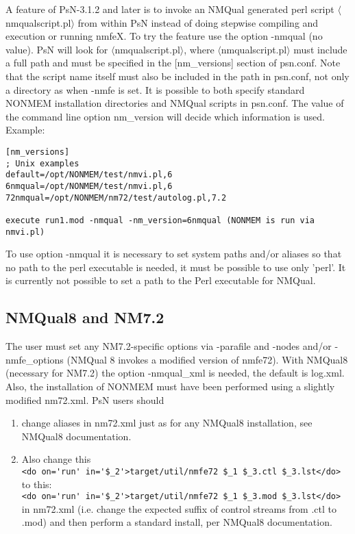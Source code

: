 \documentclass[a4paper,12pt]{article}
\begin{document}
A feature of PsN-3.1.2 and later is to invoke an NMQual generated perl script $\langle$nmqualscript.pl$\rangle$ from within PsN instead of doing stepwise compiling and execution or running nmfeX. To try the feature use the option -nmqual (no value). PsN will look for $\langle$nmqualscript.pl$\rangle$, where $\langle$nmqualscript.pl$\rangle$ must include a full path and must be specified in the [nm\_versions] section of psn.conf. Note that the script name itself must also be included in the path in psn.conf, not only a directory as when -nmfe is set. It is possible to both specify standard NONMEM installation directories and NMQual scripts in psn.conf. The value of the command line option nm\_version will decide which information is used. Example:
\begin{verbatim}
[nm_versions]
; Unix examples
default=/opt/NONMEM/test/nmvi.pl,6
6nmqual=/opt/NONMEM/test/nmvi.pl,6
72nmqual=/opt/NONMEM/nm72/test/autolog.pl,7.2

execute run1.mod -nmqual -nm_version=6nmqual (NONMEM is run via nmvi.pl)
\end{verbatim}
To use option -nmqual it is necessary to set system paths and/or aliases so that no path to the perl executable is needed, it must be possible to use only 'perl'. It is currently not possible to set a path to the Perl executable for NMQual.

\subsection{NMQual8 and NM7.2}
The user must set any NM7.2-specific options via -parafile and -nodes and/or -nmfe\_options (NMQual 8 invokes a modified version of nmfe72). With NMQual8 (necessary for NM7.2) the option -nmqual\_xml is needed, the default is log.xml.  Also, the installation of NONMEM must have been performed using a slightly modified nm72.xml. PsN users should

\begin{enumerate}
	\item change aliases in nm72.xml just as for any NMQual8 installation, see NMQual8 documentation.
	\item Also change this
	\\
\verb|<do on='run' in='$_2'>target/util/nmfe72 $_1 $_3.ctl $_3.lst</do>|
\\
to this:
\\
\verb|<do on='run' in='$_2'>target/util/nmfe72 $_1 $_3.mod $_3.lst</do>|
\\
in nm72.xml (i.e. change the expected suffix of control streams from .ctl to .mod) and then perform a standard install, per NMQual8 documentation.
\end{enumerate}
\end{document}
